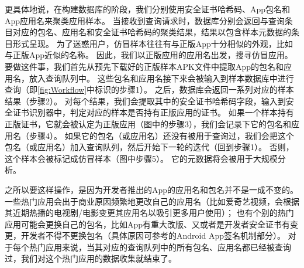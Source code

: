 更具体地说，在构建数据库的阶段，我们分别使用安全证书哈希码、App包名和App应用名来聚类应用样本。
当接收到查询请求时，数据库分别会返回与查询条目对应的包名、应用名和安全证书哈希码的聚类结果，结果以包含样本元数据的条目形式呈现。
为了迷惑用户，仿冒样本往往有与正版App十分相似的外观，比如与正版App近似的名称。
因此，我们以正版应用的应用名出发，搜寻仿冒应用。
要做这件事，我们首先从预先下载好的正版样本APK文件中提取App的包名和应用名，放入查询队列中。
这些包名和应用名接下来会被输入到样本数据库中进行查询（即\autoref{fig:Workflow}中标识的步骤1）。
之后，数据库会返回一系列对应的样本结果（步骤2）。
对每个结果，我们会提取其中的安全证书哈希码字段，输入到安全证书识别器中，判定对应的样本是否持有正版应用的证书。
如果一个样本持有正版证书，它就会被认定为正版应用（图中的步骤3），我们会记录下它的包名和应用名（步骤4）。
如果它的包名（或应用名）还没有被用于查询过，我们会把这个包名（或应用名）加入查询队列，然后开始下一轮的迭代（回到步骤1）。
否则，这个样本会被标记成仿冒样本（图中步骤5）。
它的元数据将会被用于大规模分析。

之所以要这样操作，是因为开发者推出的App的应用名和包名并不是一成不变的。
一些热门应用会出于商业原因频繁地更改自己的应用名（比如爱奇艺视频，会根据其近期热播的电视剧/电影变更其应用名以吸引更多用户使用）；
也有个别的热门应用可能会更换自己的包名，比如App有重大改版、又或者是开发者安全证书有变更，开发者不得不更换包名（具体原因可参考的Android App签名机制部分）。
对于每个热门应用来说，当其对应的查询队列中的所有包名、应用名都已经被查询过，我们对这个热门应用的数据收集就结束了。

